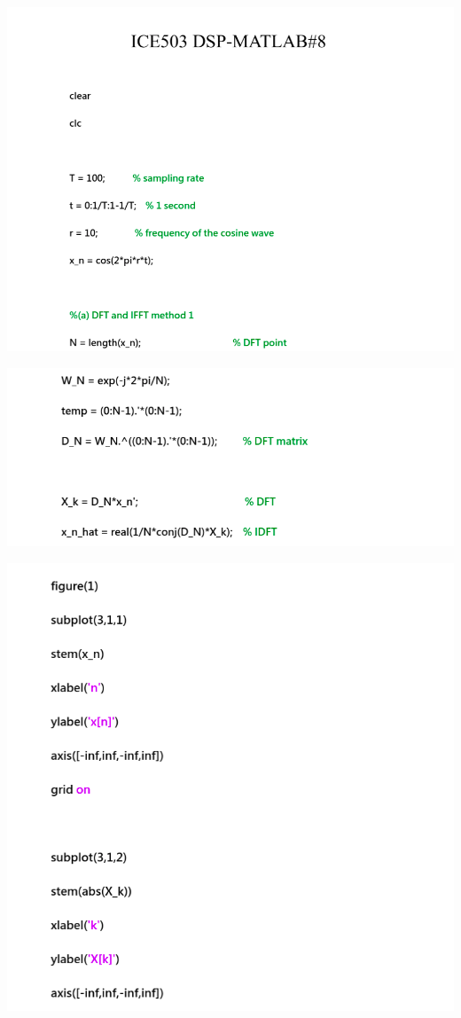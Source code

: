 \documentclass[a4paper]{article}
\begin{document}
	\begin{center}
		\includegraphics[width=1\linewidth]{screenshot083}
	\end{center}
	
	\begin{center}
		\includegraphics[width=1\linewidth]{screenshot084}
	\end{center}
	
	\begin{center}
		\includegraphics[width=1\linewidth]{screenshot085}
	\end{center}
	
\end{document}
